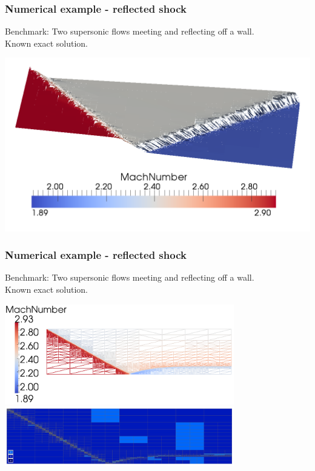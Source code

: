 \documentclass{beamer}
\begin{document}
\begin{frame}
 \frametitle{Numerical example - reflected shock}
	Benchmark: Two supersonic flows meeting and reflecting off a wall.\\
	Known exact solution.
\begin{center}
\includegraphics[width=\textwidth]{refl/screen.png}
\end{center}
\end{frame}

\begin{frame}
 \frametitle{Numerical example - reflected shock}
	Benchmark: Two supersonic flows meeting and reflecting off a wall.\\
	Known exact solution.
\begin{center}
\includegraphics[width=0.75\textwidth]{refl/screen01-sln.png}\\
\includegraphics[width=0.75\textwidth]{refl/screen001whole.png}
\end{center}
\end{frame}
\end{document}
